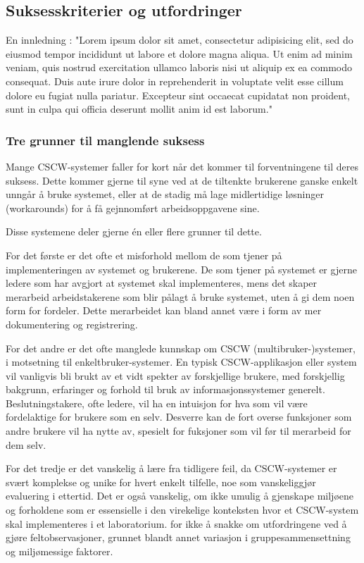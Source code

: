 \subsection{Suksesskriterier og utfordringer}
\label{chp: utfordringer}

En innledning : "Lorem ipsum dolor sit amet, consectetur adipisicing elit, sed do eiusmod tempor incididunt ut labore et dolore magna aliqua. Ut enim ad minim veniam, quis nostrud exercitation ullamco laboris nisi ut aliquip ex ea commodo consequat. Duis aute irure dolor in reprehenderit in voluptate velit esse cillum dolore eu fugiat nulla pariatur. Excepteur sint occaecat cupidatat non proident, sunt in culpa qui officia deserunt mollit anim id est laborum."

\subsubsection{Tre grunner til manglende suksess}
Mange CSCW-systemer faller for kort når det kommer til forventningene til deres suksess. Dette kommer gjerne til syne ved at de tiltenkte brukerene ganske enkelt unngår å bruke systemet, eller at de stadig må lage midlertidige løsninger (workarounds) for å få gejnnomført arbeidsoppgavene sine.

Disse systemene deler gjerne én eller flere grunner til dette.

For det første er det ofte et misforhold mellom de som tjener på implementeringen av systemet og brukerene. De som tjener på systemet er gjerne ledere som har avgjort at systemet skal implementeres, mens det skaper merarbeid arbeidstakerene som blir pålagt å bruke systemet, uten å gi dem noen form for fordeler. Dette merarbeidet kan bland annet være i form av mer dokumentering og registrering.

For det andre er det ofte manglede kunnskap om CSCW (multibruker-)systemer, i motsetning til enkeltbruker-systemer. En typisk CSCW-applikasjon eller system vil vanligvis bli brukt av et vidt spekter av forskjellige brukere, med forskjellig bakgrunn, erfaringer og forhold til bruk av informasjonssystemer generelt. Beslutningstakere, ofte ledere, vil ha en intuisjon for hva som vil være fordelaktige for brukere som en selv. Desverre kan de fort overse funksjoner som andre brukere vil ha nytte av, spesielt for fuksjoner som vil før til merarbeid for dem selv. 

For det tredje er det vanskelig å lære fra tidligere feil, da CSCW-systemer er svært komplekse og unike for hvert enkelt tilfelle, noe som vanskeliggjør evaluering i ettertid. Det er også vanskelig, om ikke umulig å gjenskape miljøene og forholdene som er essensielle i den virekelige konteksten hvor et CSCW-system skal implementeres i et laboratorium. for ikke å snakke om utfordringene ved å gjøre feltobservasjoner, grunnet blandt annet variasjon i gruppesammensettning og miljømessige faktorer. \cite{Grundin88}

